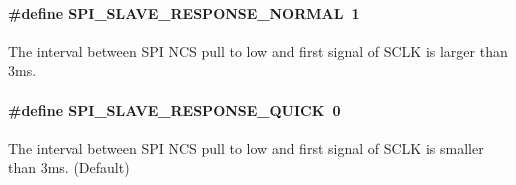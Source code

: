 \paragraph[{\texorpdfstring{S\+P\+I\+\_\+\+S\+L\+A\+V\+E\+\_\+\+R\+E\+S\+P\+O\+N\+S\+E\+\_\+\+N\+O\+R\+M\+AL}{SPI_SLAVE_RESPONSE_NORMAL}}]{\setlength{\rightskip}{0pt plus 5cm}\#define S\+P\+I\+\_\+\+S\+L\+A\+V\+E\+\_\+\+R\+E\+S\+P\+O\+N\+S\+E\+\_\+\+N\+O\+R\+M\+AL~1}\hypertarget{group___s_p_i___s_l_a_v_e___r_e_s_p_o_n_s_e___m_o_d_e_gace26547a9b6450050c7a9f63ba611e0a}{}\label{group___s_p_i___s_l_a_v_e___r_e_s_p_o_n_s_e___m_o_d_e_gace26547a9b6450050c7a9f63ba611e0a}
The interval between S\+PI N\+CS pull to low and first signal of S\+C\+LK is larger than 3ms. 
\paragraph[{\texorpdfstring{S\+P\+I\+\_\+\+S\+L\+A\+V\+E\+\_\+\+R\+E\+S\+P\+O\+N\+S\+E\+\_\+\+Q\+U\+I\+CK}{SPI_SLAVE_RESPONSE_QUICK}}]{\setlength{\rightskip}{0pt plus 5cm}\#define S\+P\+I\+\_\+\+S\+L\+A\+V\+E\+\_\+\+R\+E\+S\+P\+O\+N\+S\+E\+\_\+\+Q\+U\+I\+CK~0}\hypertarget{group___s_p_i___s_l_a_v_e___r_e_s_p_o_n_s_e___m_o_d_e_ga5a728250fd552e4e0124b52cb74e6a9f}{}\label{group___s_p_i___s_l_a_v_e___r_e_s_p_o_n_s_e___m_o_d_e_ga5a728250fd552e4e0124b52cb74e6a9f}
The interval between S\+PI N\+CS pull to low and first signal of S\+C\+LK is smaller than 3ms. (Default) 